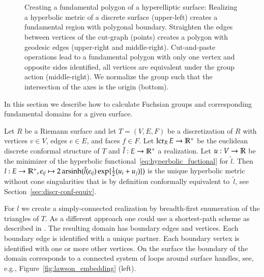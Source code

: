 \documentclass[Thesis]{subfiles}
\begin{document}
\begin{figure}
\centering
{}\\
\\
\caption{
Creating a fundamental polygon of a hyperelliptic surface:
Realizing a hyperbolic metric of a discrete surface (upper-left) creates a fundamental region with polygonal boundary.
Straighten the edges between vertices of the cut-graph (points) creates a polygon with geodesic edges (upper-right and middle-right).
Cut-and-paste operations lead to a fundamental polygon with only one vertex and opposite sides identified, all vertices are equivalent under the group action (middle-right).
We normalize the group such that the intersection of the axes is the origin (bottom).
}
\label{fig:fundamental_polygon_algorithm}
\end{figure}

In this section we describe how to calculate Fuchsian groups and corresponding fundamental domains for a given surface.

Let $R$ be a Riemann surface and let $T=(V, E, F)$ be a discretization of $R$ with vertices $v\in V$, edges $e\in E$, and faces $f\in F$. Let $\operatorname{lcr}_R E\to \mathbb R^+$ be the euclidean discrete conformal structure of $T$ and $\tilde l:E\to \mathbb R^+$ a realization. Let $u:V\to \mathbb R$ be the minimizer of the hyperbolic functional~\ref{eq:hyperbolic_fuctional} for $\tilde l$. Then $l:E \to \mathbb R^+, e_{\it ij}\mapsto 2\operatorname{arsinh}(\tilde l(e_{\it ij})\exp\{\frac{1}{2}(u_i+u_j)\})$ is the unique hyperbolic metric without cone singularities that is by definition conformally equivalent to~$\tilde l$, see Section~\ref{sec:discr-conf-equiv}.

For $l$ we create a simply-connected realization by breadth-first enumeration of the triangles of $T$. As a different approach one could use a shortest-path scheme as described in \cite{EricksonH02}.  The resulting domain has boundary edges and vertices. Each boundary edge is identified with a unique partner. Each boundary vertex is identified with one or more other vertices. On the surface the boundary of the domain corresponds to a connected system of loops around surface handles, see, e.g., Figure~\ref{fig:lawson_embedding} (left).
\end{document}
